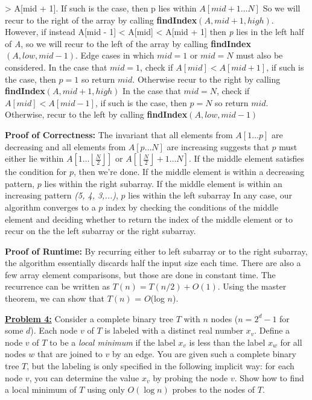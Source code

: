 \documentclass[11pt]{article}
\begin{document}
\begin{flushleft}
		\textgreater{ A[mid + 1]}. If such is the case, then p lies within $A[mid + 1 \dots N]$ So we will recur to the right of the array by calling \textbf{findIndex}$(A, mid + 1, high)$.
		However, if instead A[mid - 1] \textless{ A[mid]} \textless { A[mid + 1]} then \emph{p} lies in the left half of \emph{A}, so we will recur to the left of the array by calling
		\textbf{findIndex$(A, low, mid -1)$}.\newpage
		Edge cases in which $mid = 1$ or $mid = N$ must also be considered.\newline
		In the case that $mid = 1$, check if $A[mid] < A[mid + 1]$, if such is the case, then $p = 1$ so return $mid$. Otherwise recur to the right by calling \textbf{findIndex}$(A, mid + 1, high)$\newline
		In the case that $mid = N$, check if $A[mid] < A[mid - 1]$, if such is the case, then $p = N$ so return $mid$. Otherwise, recur to the left by calling \textbf{findIndex}$(A, low, mid - 1)$\newline
		  
		\textbf{Proof of Correctness:} The invariant that all elements from $A[1 \dots p]$ are decreasing and all elements from $A[p \dots N]$ are increasing suggests that $p$ must either lie within $A[1 \dots \left\lfloor\frac{N}{2}\right\rfloor]$ or 
		$A[\left\lfloor\frac{N}{2}\right\rfloor + 1 \dots N]$. \newline
		If the middle element satisfies the condition for $p$, then we're done.
		If the middle element is within a decreasing pattern, $p$ lies within the right subarray.  
		If the middle element is within an increasing pattern \emph{(5, 4, 3,...)}, $p$ lies within the left subarray
		In any case, our algorithm converges to a $p$ index by checking the conditions of the middle element and deciding whether to return the index of the middle element or to recur on the the left subarray or the right subarray. \newline
		\vspace{0.2cm}
		
		\textbf{Proof of Runtime:} By recurring either to left subarray or to the right subarray, the algorithm essentially discards half the input size each time. There are also a few array element comparisons, but those are done in constant time. The recurrence can be written as $T(n) = T(n / 2) + O(1)$. Using the master theorem, we can show that $T(n)$ = $O$(log $n$).
		\vspace{0.2cm}
		
		\item \textbf {\underline{Problem 4:}} Consider a complete binary tree $T$ with $n$ nodes ($n = 2^d-1$ for some $d$). Each node $v$ of $T$ is labeled with a distinct real number $x_v$. Define a node $v$ of $T$ to be a \textit{local minimum} if the label $x_v$ is less than the label $x_w$ for all nodes $w$ that are joined to $v$ by an edge. You are given such a complete binary tree $T$, but the labeling is only specified in the following implicit way: for each node $v$, you can determine the value $x_v$ by probing the node $v$. Show how to find a local minimum of $T$ using only $O(\log n)$ probes to the nodes of $T$.\newline
		

\end{flushleft}
\end{document}
